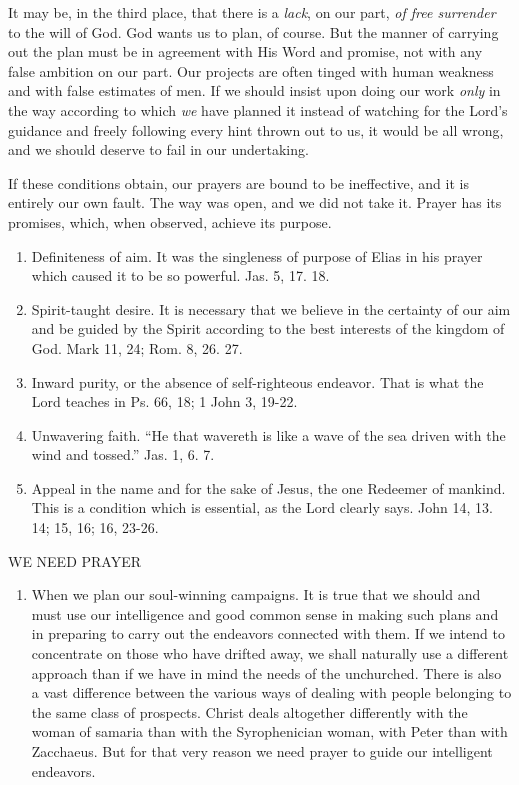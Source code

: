 \documentclass[
]{book}
\providecommand{\tightlist}{%
  \setlength{\itemsep}{0pt}\setlength{\parskip}{0pt}}
\begin{document}
It may be, in the third place, that there is a \emph{lack}, on our part, \emph{of free surrender} to the will of God. God wants us to plan, of course. But the manner of carrying out the plan must be in agreement with His Word and promise, not with any false ambition on our part. Our projects are often tinged with human weakness and with false estimates of men. If we should insist upon doing our work \emph{only} in the way according to which \emph{we} have planned it instead of watching for the Lord's guidance and freely following every hint thrown out to us, it would be all wrong, and we should deserve to fail in our undertaking.

If these conditions obtain, our prayers are bound to be ineffective, and it is entirely our own fault. The way was open, and we did not take it. Prayer has its promises, which, when observed, achieve its purpose.

\begin{enumerate}
\def\labelenumi{\arabic{enumi}.}
\item
  Definiteness of aim. It was the singleness of purpose of Elias in his prayer which caused it to be so powerful. Jas. 5, 17. 18.
\item
  Spirit-taught desire. It is necessary that we believe in the certainty of our aim and be guided by the Spirit according to the best interests of the kingdom of God. Mark 11, 24; Rom. 8, 26. 27.
\item
  Inward purity, or the absence of self-righteous endeavor. That is what the Lord teaches in Ps. 66, 18; 1 John 3, 19-22.
\item
  Unwavering faith. ``He that wavereth is like a wave of the sea driven with the wind and tossed.'' Jas. 1, 6. 7.
\item
  Appeal in the name and for the sake of Jesus, the one Redeemer of mankind. This is a condition which is essential, as the Lord clearly says. John 14, 13. 14; 15, 16; 16, 23-26.
\end{enumerate}

WE NEED PRAYER

\begin{enumerate}
\def\labelenumi{\alph{enumi}.}
\tightlist
\item
  When we plan our soul-winning campaigns. It is true that we should and must use our intelligence and good common sense in making such plans and in preparing to carry out the endeavors connected with them. If we intend to concentrate on those who have drifted away, we shall naturally use a different approach than if we have in mind the needs of the unchurched. There is also a vast difference between the various ways of dealing with people belonging to the same class of prospects. Christ deals altogether differently with the woman of samaria than with the Syrophenician woman, with Peter than with Zacchaeus. But for that very reason we need prayer to guide our intelligent endeavors.
\end{enumerate}
\end{document}
